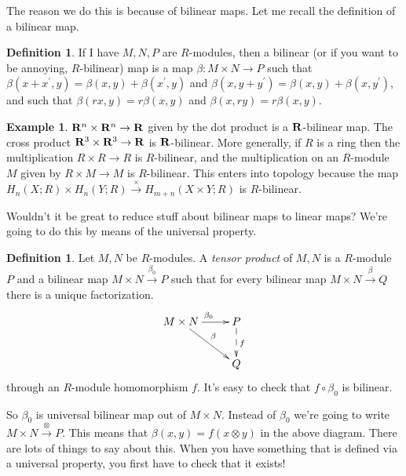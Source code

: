 \documentclass{amsart}
\theoremstyle{theorem}
\theoremstyle{definition}
\newtheorem{definition}[theorem]{Definition}
\newtheorem{example}[theorem]{Example}
\begin{document}
The reason we do this is because of bilinear maps. Let me recall the definition of a bilinear map.
\begin{definition}
If I have $M,N,P$ are $R$-modules, then a bilinear (or if you want to be annoying, $R$-bilinear) map is a map $\beta:M\times N\to P$ such that $\beta(x+x^\prime,y)=\beta(x,y)+\beta(x^\prime,y)$ and $\beta(x,y+y^\prime)=\beta(x,y)+\beta(x,y^\prime)$, and such that $\beta(rx,y)=r\beta(x,y)$ and $\beta(x,ry)=r\beta(x,y)$.
\end{definition}
\begin{example}
$\mathbf R^n\times\mathbf R^n\to\mathbf R$ given by the dot product is a $\mathbf R$-bilinear map. The cross product $\mathbf R^3\times\mathbf R^3\to\mathbf R$ is $\mathbf R$-bilinear. More generally, if $R$ is a ring then the multiplication $R\times R\to R$ is $R$-bilinear, and the multiplication on an $R$-module $M$ given by $R\times M\to M$ is $R$-bilinear. This enters into topology because the map $ H_n(X;R)\times H_n(Y;R)\xrightarrow{\times} H_{m+n}(X\times Y;R)$ is $R$-bilinear.
\end{example}
Wouldn't it be great to reduce stuff about bilinear maps to linear maps? We're going to do this by means of the universal property.
\begin{definition}
Let $M,N$ be $R$-modules. A \emph{tensor product} of $M,N$ is a $R$-module $P$ and a bilinear map $M\times N\xrightarrow{\beta_0}P$ such that for every bilinear map $M\times N\xrightarrow{\beta}Q$ there is a unique factorization.
\begin{equation*}
\xymatrix{M\times N\ar[r]^{\beta_0}\ar[dr]^\beta & P\ar@{-->}[d]^f\\
 & Q}
\end{equation*}
through an $R$-module homomorphism $f$. It's easy to check that $f\circ\beta_0$ is bilinear.
\end{definition}
So $\beta_0$ is universal bilinear map out of $M\times N$. Instead of $\beta_0$ we're going to write $M\times N\xrightarrow{\otimes}P$. This means that $\beta(x,y)=f(x\otimes y)$ in the above diagram. There are lots of things to say about this. When you have something that is defined via a universal property, you first have to check that it exists!
\end{document}
